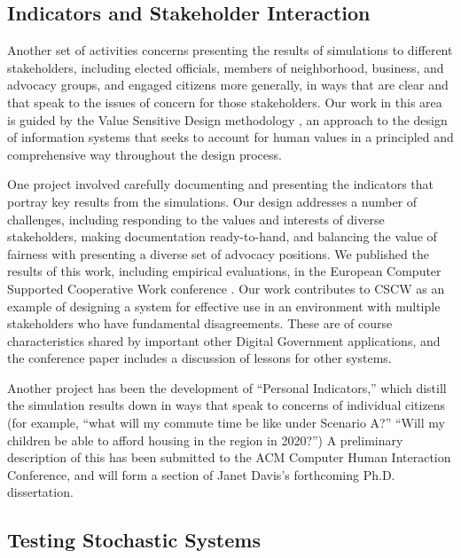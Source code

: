 \documentclass{acm_proc_article-sp}
\begin{document}
\subsection{Indicators and Stakeholder Interaction}

Another set of activities concerns presenting the results of simulations to
different stakeholders, including elected officials, members of
neighborhood, business, and advocacy groups, and engaged citizens more
generally, in ways that are clear and that speak to the issues of concern
for those stakeholders.  Our work in this area is guided by the Value
Sensitive Design methodology \cite{friedman-amis-2006}, an approach to the
design of information systems that seeks to account for human values in a
principled and comprehensive way throughout the design process.

One project involved carefully documenting and presenting the indicators
that portray key results from the simulations. Our design addresses a
number of challenges, including responding to the values and interests of
diverse stakeholders, making documentation ready-to-hand, and balancing the
value of fairness with presenting a diverse set of advocacy positions.  We
published the results of this work, including empirical evaluations, in the
European Computer Supported Cooperative Work conference
\cite{borning-ecscw-2005}.  Our work contributes to CSCW as an example of
designing a system for effective use in an environment with multiple
stakeholders who have fundamental disagreements.  These are of course
characteristics shared by important other Digital Government applications,
and the conference paper includes a discussion of lessons for other systems.

Another project has been the development of ``Personal Indicators,'' which
distill the simulation results down in ways that speak to concerns of
individual citizens (for example, ``what will my commute time be like under
Scenario A?''  ``Will my children be able to afford housing in the region
in 2020?'')  A preliminary description of this has been submitted to the
ACM Computer Human Interaction Conference, and will form a section
of Janet Davis's forthcoming Ph.D. dissertation.

\subsection{Testing Stochastic Systems}
\end{document}

